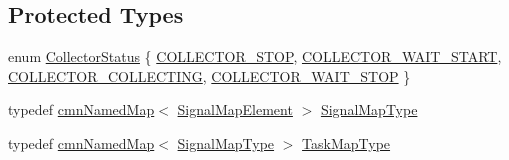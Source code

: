 \subsection*{Protected Types}
\begin{DoxyCompactItemize}
\item 
enum \hyperlink{group__cisst_multi_task_gadfbc058665584a56933a7997229c1fb6}{Collector\+Status} \{ \hyperlink{group__cisst_multi_task_ggadfbc058665584a56933a7997229c1fb6a2bf9d2e7c0bcf5aa734411dd6c969ff2}{C\+O\+L\+L\+E\+C\+T\+O\+R\+\_\+\+S\+T\+O\+P}, 
\hyperlink{group__cisst_multi_task_ggadfbc058665584a56933a7997229c1fb6a67657229ff967c447ed3289c730bdf11}{C\+O\+L\+L\+E\+C\+T\+O\+R\+\_\+\+W\+A\+I\+T\+\_\+\+S\+T\+A\+R\+T}, 
\hyperlink{group__cisst_multi_task_ggadfbc058665584a56933a7997229c1fb6a9162148874993d7a2bf7a40bd5b1ad24}{C\+O\+L\+L\+E\+C\+T\+O\+R\+\_\+\+C\+O\+L\+L\+E\+C\+T\+I\+N\+G}, 
\hyperlink{group__cisst_multi_task_ggadfbc058665584a56933a7997229c1fb6a84e8e4233359e044e0f7db8ddc04f8c5}{C\+O\+L\+L\+E\+C\+T\+O\+R\+\_\+\+W\+A\+I\+T\+\_\+\+S\+T\+O\+P}
 \}
\item 
typedef \hyperlink{classcmn_named_map}{cmn\+Named\+Map}$<$ \hyperlink{classmts_collector_base_1_1_signal_map_element}{Signal\+Map\+Element} $>$ \hyperlink{classmts_collector_base_ad4d928af971d864065a9a6d9650a4050}{Signal\+Map\+Type}
\item 
typedef \hyperlink{classcmn_named_map}{cmn\+Named\+Map}$<$ \hyperlink{classmts_collector_base_ad4d928af971d864065a9a6d9650a4050}{Signal\+Map\+Type} $>$ \hyperlink{classmts_collector_base_a6b47b3df8797f600ac9791640561f035}{Task\+Map\+Type}
\end{DoxyCompactItemize}
